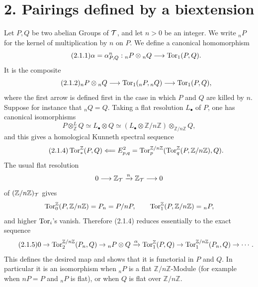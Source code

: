 \documentclass[11pt]{article}
\begin{document}
\section*{2. Pairings defined by a biextension}

Let \(P,Q\) be two abelian Groups of \(\mathcal T\), and let \(n>0\) be an integer.  We write \({}_nP\) for the kernel of multiplication by \(n\) on \(P\).  We define a canonical homomorphism
\begin{equation}\qquad\text{(2.1.1)}
        \alpha=\alpha^n_{P,Q}:{}_nP\otimes{}_nQ\longrightarrow \operatorname{Tor}_1(P,Q).
\end{equation}
It is the composite
\begin{equation}\qquad\text{(2.1.2)}
        {}_nP\otimes{}_nQ
        \longrightarrow \operatorname{Tor}_1({}_nP,{}_{n}Q)
        \longrightarrow \operatorname{Tor}_1(P,Q),
\end{equation}
where the first arrow is defined first in the case in which \(P\) and \(Q\) are killed by \(n\).  Suppose for instance that \({}_nQ=Q\).  Taking a flat resolution \(L_\bullet\) of \(P\), one has canonical isomorphisms
\[
        P\otimes^L_{\mathbb Z}Q
        \simeq L_\bullet\otimes Q
        \simeq (L_\bullet\otimes \mathbb Z/n\mathbb Z)\otimes_{\mathbb Z/n\mathbb Z}Q,
\]
and this gives a homological Kunneth spectral sequence
\begin{equation}\qquad\text{(2.1.4)}
        \operatorname{Tor}_*^{\mathbb Z}(P,Q)
        \Longleftarrow
        E^2_{p,q}=\operatorname{Tor}_p^{\mathbb Z/n\mathbb Z}
        (\operatorname{Tor}_q^{\mathbb Z}(P,\mathbb Z/n\mathbb Z),Q).
\end{equation}
The usual flat resolution
\[
        0\longrightarrow\mathbb Z_\mathcal T\xrightarrow{n}\mathbb Z_\mathcal T\longrightarrow0
\]
of \((\mathbb Z/n\mathbb Z)_\mathcal T\) gives
\[
        \operatorname{Tor}_0^{\mathbb Z}(P,\mathbb Z/n\mathbb Z)=P_n=P/nP,
        \qquad
        \operatorname{Tor}_1^{\mathbb Z}(P,\mathbb Z/n\mathbb Z)={}_nP,
\]
and higher \(\operatorname{Tor}_i\)'s vanish.  Therefore (2.1.4) reduces essentially to the exact sequence
\begin{equation}\qquad\text{(2.1.5)}
0\to \operatorname{Tor}_2^{\mathbb Z/n\mathbb Z}(P_n,Q)\to {}_nP\otimes Q
\xrightarrow{\alpha}\operatorname{Tor}_1^{\mathbb Z}(P,Q)\to\operatorname{Tor}_1^{\mathbb Z/n\mathbb Z}(P_n,Q)\to\cdots .
\end{equation}
This defines the desired map and shows that it is functorial in \(P\) and \(Q\).  In particular it is an isomorphism when \({}_nP\) is a flat \(\mathbb Z/n\mathbb Z\)-Module (for example when \(nP=P\) and \({}_nP\) is flat), or when \(Q\) is flat over \(\mathbb Z/n\mathbb Z\).
\end{document}
